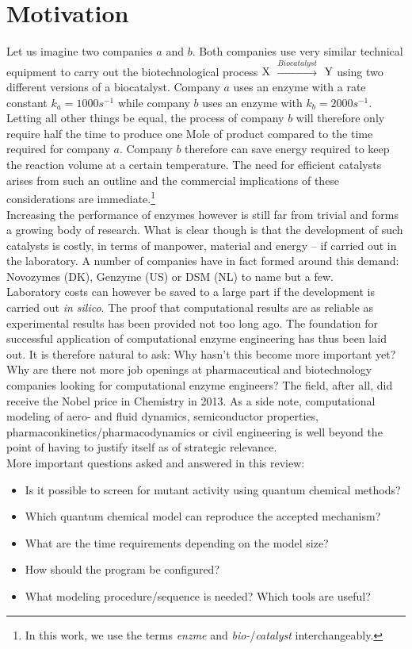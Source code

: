 \section{Motivation}\label{sec:mot}
Let us imagine two companies $a$ and $b$.
Both companies use very similar technical equipment to carry out the biotechnological process $\ce{X}$ $\xrightarrow{Biocatalyst}$ $\ce{Y}$ using two different versions of a biocatalyst.
Company $a$ uses an enzyme with a rate constant $k_{a} = 1000s^{-1}$ while company $b$ uses an enzyme with $k_{b} = 2000s^{-1}$.
Letting all other things be equal, the process of company $b$ will therefore only require half the time to produce one Mole of product compared to the time required for company $a$.
Company $b$ therefore can save energy required to keep the reaction volume at a certain temperature.
The need for efficient catalysts arises from such an outline and the commercial implications of these considerations are immediate.\footnote{In this work, we use the terms \textit{enzme} and \textit{bio-}/\textit{catalyst} interchangeably.}\\
Increasing the performance of enzymes however is still far from trivial and forms a growing body of research.
What is clear though is that the development of such catalysts is costly, in terms of manpower, material and energy -- if carried out in the laboratory.
A number of companies have in fact formed around this demand: Novozymes (DK), Genzyme (US) or DSM (NL) to name but a few\cite{meyer2013use, kirk2002industrial, beilen2002enzyme, schmid2002use}.\\
Laboratory costs can however be saved to a large part if the development is carried out \textit{in silico}.
The proof that computational results are as reliable as experimental results has been provided not too long ago\cite{claeyssens2006high}.
The foundation for successful application of computational enzyme engineering has thus been laid out.
It is therefore natural to ask: Why hasn't this become more important yet?
Why are there not more job openings at pharmaceutical and biotechnology companies looking for computational enzyme engineers?
The field, after all, did receive the Nobel price in Chemistry in 2013.
As a side note, computational modeling of aero- and fluid dynamics, semiconductor properties, pharmaconkinetics/pharmacodynamics or civil engineering is well beyond the point of having to justify itself as of strategic relevance.\\
More important questions asked and answered in this review:
\begin{itemize}
\item Is it possible to screen for mutant activity using quantum chemical methods?
\item Which quantum chemical model can reproduce the accepted mechanism?
\item What are the time requirements depending on the model size?
\item How should the program be configured?
\item What modeling procedure/sequence is needed? Which tools are useful?
\end{itemize}
